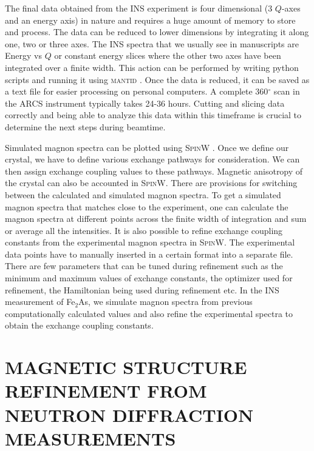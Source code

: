 \documentclass[10pt,doublespacing,edeposit]{uiucthesis2020}
\begin{document}
\begin{mainmatter}
The final data obtained from the INS experiment is four dimensional (3 $Q$-axes and an energy axis) in nature and requires a huge amount of memory to store and process. The data can be reduced to lower dimensions by integrating it along one, two or three axes. The INS spectra that we usually see in manuscripts are Energy vs $Q$ or constant energy slices where the other two axes have been integrated over a finite width. This action can be performed by writing python scripts and running it using \textsc{mantid} \cite{Arnold2014}. Once the data is reduced, it can be saved as a text file for easier processing on personal computers. A complete 360$^\circ$ scan in the ARCS instrument typically takes 24-36 hours. Cutting and slicing data correctly and being able to analyze this data within this timeframe is crucial to determine the next steps during beamtime.

Simulated magnon spectra can be plotted using \textsc{SpinW} \cite{Toth_2015}. Once we define our crystal, we have to define various exchange pathways for consideration. We can then assign exchange coupling values to these pathways. Magnetic anisotropy of the crystal can also be accounted in \textsc{SpinW}. There are provisions for switching between the calculated and simulated magnon spectra. To get a simulated magnon spectra that matches close to the experiment, one can calculate the magnon spectra at different points across the finite width of integration and sum or average all the intensities. It is also possible to refine exchange coupling constants from the experimental magnon spectra in \textsc{SpinW}. The experimental data points have to manually inserted in a certain format into a separate file. There are few parameters that can be tuned during refinement such as the minimum and maximum values of exchange constants, the optimizer used for refinement, the Hamiltonian being used during refinement etc. In the INS measurement of Fe$_2$As, we simulate magnon spectra from previous computationally calculated values and also refine the experimental spectra to obtain the exchange coupling constants.




\chapter{MAGNETIC STRUCTURE REFINEMENT FROM NEUTRON DIFFRACTION MEASUREMENTS}

\vspace{10mm}


\end{mainmatter}
\end{document}
